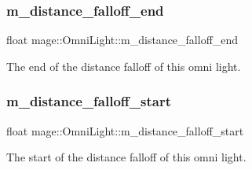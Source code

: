 \subsubsection{\texorpdfstring{m\+\_\+distance\+\_\+falloff\+\_\+end}{m\_distance\_falloff\_end}}
{\footnotesize\ttfamily float mage\+::\+Omni\+Light\+::m\+\_\+distance\+\_\+falloff\+\_\+end\hspace{0.3cm}{\ttfamily [private]}}

The end of the distance falloff of this omni light. \hypertarget{classmage_1_1_omni_light_ab784744d39ad3d4f4a7b2214a55108f7}{}\label{classmage_1_1_omni_light_ab784744d39ad3d4f4a7b2214a55108f7} 
\subsubsection{\texorpdfstring{m\+\_\+distance\+\_\+falloff\+\_\+start}{m\_distance\_falloff\_start}}
{\footnotesize\ttfamily float mage\+::\+Omni\+Light\+::m\+\_\+distance\+\_\+falloff\+\_\+start\hspace{0.3cm}{\ttfamily [private]}}

The start of the distance falloff of this omni light. 